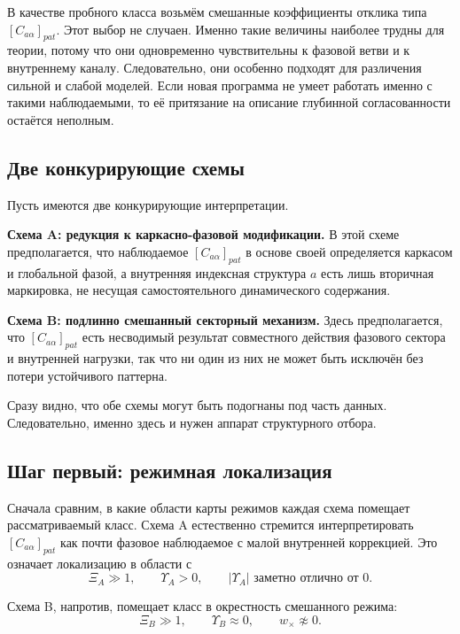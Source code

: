 \documentclass[12pt,a4paper]{article}
\begin{document}
В качестве пробного класса возьмём смешанные коэффициенты отклика типа \([C_{a\alpha}]_{pat}\). Этот выбор не случаен. Именно такие величины наиболее трудны для теории, потому что они одновременно чувствительны к фазовой ветви и к внутреннему каналу. Следовательно, они особенно подходят для различения сильной и слабой моделей. Если новая программа не умеет работать именно с такими наблюдаемыми, то её притязание на описание глубинной согласованности остаётся неполным.

\subsection{Две конкурирующие схемы}

Пусть имеются две конкурирующие интерпретации.

\textbf{Схема A: редукция к каркасно-фазовой модификации.} В этой схеме предполагается, что наблюдаемое \([C_{a\alpha}]_{pat}\) в основе своей определяется каркасом и глобальной фазой, а внутренняя индексная структура \(a\) есть лишь вторичная маркировка, не несущая самостоятельного динамического содержания.

\textbf{Схема B: подлинно смешанный секторный механизм.} Здесь предполагается, что \([C_{a\alpha}]_{pat}\) есть несводимый результат совместного действия фазового сектора и внутренней нагрузки, так что ни один из них не может быть исключён без потери устойчивого паттерна.

Сразу видно, что обе схемы могут быть подогнаны под часть данных. Следовательно, именно здесь и нужен аппарат структурного отбора.

\subsection{Шаг первый: режимная локализация}

Сначала сравним, в какие области карты режимов каждая схема помещает рассматриваемый класс. Схема A естественно стремится интерпретировать \([C_{a\alpha}]_{pat}\) как почти фазовое наблюдаемое с малой внутренней коррекцией. Это означает локализацию в области с
\begin{equation}
\Xi_A \gg 1,
\qquad
\Upsilon_A > 0,
\qquad
|\Upsilon_A| \text{ заметно отлично от } 0.
\end{equation}

Схема B, напротив, помещает класс в окрестность смешанного режима:
\begin{equation}
\Xi_B \gg 1,
\qquad
\Upsilon_B \approx 0,
\qquad
w_{\times} \not\approx 0.
\end{equation}
\end{document}

